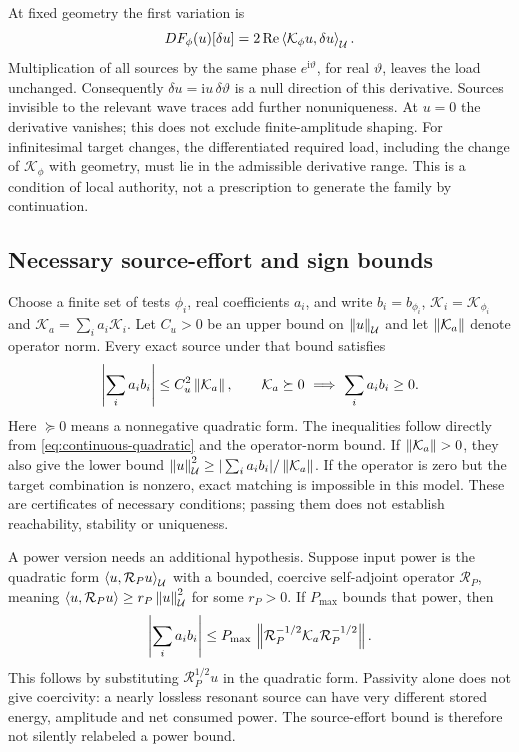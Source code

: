 At fixed geometry the first variation is
\begin{equation}
 DF_\phi(u)[\delta u]=
       2\operatorname{Re}\left\langle\mathcal K_\phi u,\delta u\right\rangle_{\mathcal U}.
 \label{eq:continuous-load-derivative}
\end{equation}
Multiplication of all sources by the same phase $e^{\mathrm i\vartheta}$,
for real $\vartheta$, leaves the load unchanged. Consequently $\delta u=
\mathrm i u\,\delta\vartheta$ is a null direction of this derivative.
Sources invisible to the relevant wave traces add further nonuniqueness.
At $u=0$ the derivative vanishes; this does not exclude finite-amplitude
shaping. For infinitesimal target changes, the differentiated required load,
including the change of $\mathcal K_\phi$ with geometry, must lie in the
admissible derivative range. This is a condition of local authority, not a
prescription to generate the family by continuation.

\subsection{Necessary source-effort and sign bounds}
Choose a finite set of tests $\phi_i$, real coefficients $a_i$, and write
$b_i=b_{\phi_i}$, $\mathcal K_i=\mathcal K_{\phi_i}$ and
$\mathcal K_a=\sum_i a_i\mathcal K_i$. Let $C_u>0$ be an upper bound on
$\left\lVert u\right\rVert_{\mathcal U}$ and let $\left\lVert\mathcal K_a\right\rVert$ denote operator norm.
Every exact source under that bound satisfies
\begin{equation}
 \left|\sum_i a_i b_i\right|\leq C_u^2\left\lVert\mathcal K_a\right\rVert,
 \qquad
 \mathcal K_a\succeq0\ \Longrightarrow\ \sum_i a_i b_i\geq0.
 \label{eq:continuous-certificates}
\end{equation}
Here $\succeq0$ means a nonnegative quadratic form. The inequalities follow
directly from \cref{eq:continuous-quadratic} and the operator-norm bound.
If $\left\lVert\mathcal K_a\right\rVert>0$, they also give the lower bound
$\left\lVert u\right\rVert_{\mathcal U}^2\geq|\sum_i a_i b_i|/\left\lVert\mathcal K_a\right\rVert$.
If the operator is zero but the target combination is nonzero, exact matching
is impossible in this model. These are certificates of necessary conditions;
passing them does not establish reachability, stability or uniqueness.

A power version needs an additional hypothesis. Suppose input power is the
quadratic form $\left\langle u,\mathcal R_Pu\right\rangle_{\mathcal U}$ with a bounded,
coercive self-adjoint operator $\mathcal R_P$, meaning
$\left\langle u,\mathcal R_Pu\right\rangle\geq r_P\left\lVert u\right\rVert_{\mathcal U}^2$ for some
$r_P>0$. If $P_{\max}$ bounds that power, then
\begin{equation}
 \left|\sum_i a_i b_i\right|
 \leq P_{\max}\,
 \left\lVert\mathcal R_P^{-1/2}\mathcal K_a\mathcal R_P^{-1/2}\right\rVert.
 \label{eq:continuous-power-bound}
\end{equation}
This follows by substituting $\mathcal R_P^{1/2}u$ in the quadratic form.
Passivity alone does not give coercivity: a nearly lossless resonant source
can have very different stored energy, amplitude and net consumed power.
The source-effort bound is therefore not silently relabeled a power bound.

